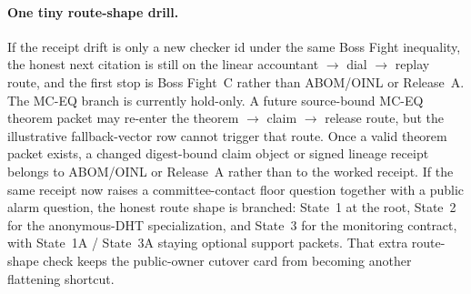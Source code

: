 \documentclass[11pt]{article}
\begin{document}
\paragraph{One tiny route-shape drill.}
If the receipt drift is only a new checker id under the same Boss Fight inequality, the honest next citation is still on the linear accountant $\to$ dial $\to$ replay route, and the first stop is Boss Fight~C rather than ABOM/OINL or Release~A.\cite{series:bossfightA,series:bossfightB,series:bossfightC}
The MC-EQ branch is currently hold-only. A future source-bound MC-EQ theorem packet may re-enter the theorem $\to$ claim $\to$ release route, but the illustrative fallback-vector row cannot trigger that route. Once a valid theorem packet exists, a changed digest-bound claim object or signed lineage receipt belongs to ABOM/OINL or Release~A rather than to the worked receipt.\cite{series:mceq,series:abomoinl,series:releaseproperty}
If the same receipt now raises a committee-contact floor question together with a public alarm question, the honest route shape is branched: State~1 at the root, State~2 for the anonymous-DHT specialization, and State~3 for the monitoring contract, with State~1A / State~3A staying optional support packets.\cite{series:state1,series:state1A,series:mucc,series:state3,series:state3A}
That extra route-shape check keeps the public-owner cutover card from becoming another flattening shortcut.
\end{document}
